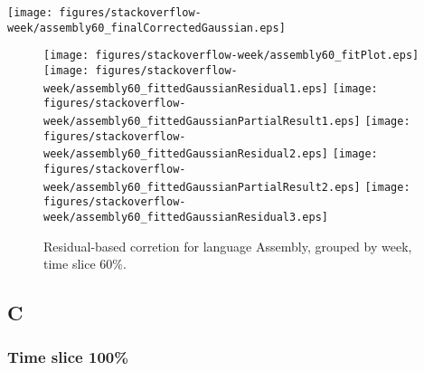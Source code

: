 \begin{center}
{\texttt{[image: figures/stackoverflow-week/assembly60\_finalCorrectedGaussian.eps]}}
\end{center}

\FloatBarrier

\begin{figure}[t]
\centering
{}
{\texttt{[image: figures/stackoverflow-week/assembly60\_fitPlot.eps]}}
{\texttt{[image: figures/stackoverflow-week/assembly60\_fittedGaussianResidual1.eps]}}
{\texttt{[image: figures/stackoverflow-week/assembly60\_fittedGaussianPartialResult1.eps]}}
{\texttt{[image: figures/stackoverflow-week/assembly60\_fittedGaussianResidual2.eps]}}
{\texttt{[image: figures/stackoverflow-week/assembly60\_fittedGaussianPartialResult2.eps]}}
{\texttt{[image: figures/stackoverflow-week/assembly60\_fittedGaussianResidual3.eps]}}
\caption{Residual-based corretion for language Assembly, grouped by week, time slice 60\%.}
\end{figure}


\FloatBarrier


\subsection{C}

\subsubsection{Time slice 100\%}

